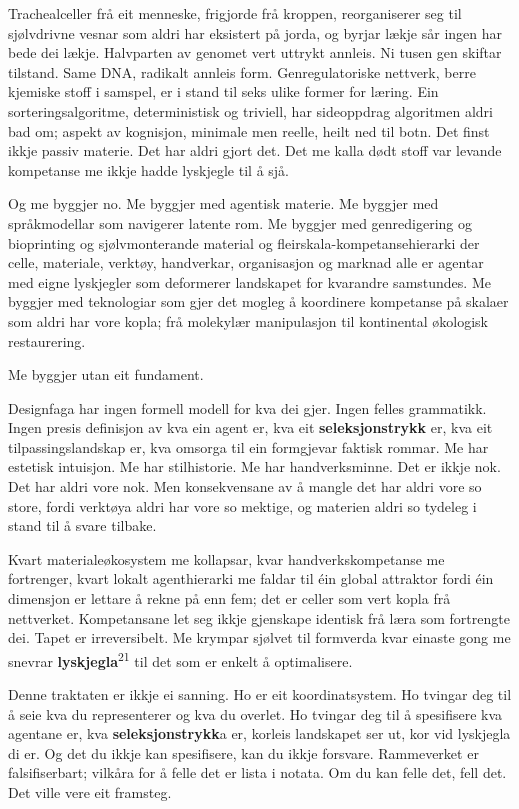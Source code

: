 \begin{widebody}
{Trachealceller frå eit menneske, frigjorde frå kroppen, reorganiserer seg til sjølvdrivne vesnar som aldri har eksistert på jorda, og byrjar lækje sår ingen har bede dei lækje. Halvparten av genomet vert uttrykt annleis. Ni tusen gen skiftar tilstand. Same DNA, radikalt annleis form. Genregulatoriske nettverk, berre kjemiske stoff i samspel, er i stand til seks ulike former for læring. Ein sorteringsalgoritme, deterministisk og triviell, har sideoppdrag algoritmen aldri bad om; aspekt av kognisjon, minimale men reelle, heilt ned til botn. Det finst ikkje passiv materie. Det har aldri gjort det. Det me kalla dødt stoff var levande kompetanse me ikkje hadde lyskjegle til å sjå.

Og me byggjer no. Me byggjer med agentisk materie. Me byggjer med språkmodellar som navigerer latente rom. Me byggjer med genredigering og bioprinting og sjølvmonterande material og fleirskala-kompetansehierarki der celle, materiale, verktøy, handverkar, organisasjon og marknad alle er agentar med eigne lyskjegler som deformerer landskapet for kvarandre samstundes. Me byggjer med teknologiar som gjer det mogleg å koordinere kompetanse på skalaer som aldri har vore kopla; frå molekylær manipulasjon til kontinental økologisk restaurering.

Me byggjer utan eit fundament.

Designfaga har ingen formell modell for kva dei gjer. Ingen felles grammatikk. Ingen presis definisjon av kva ein agent er, kva eit \textbf{seleksjonstrykk} er, kva eit tilpassingslandskap er, kva omsorga til ein formgjevar faktisk rommar. Me har estetisk intuisjon. Me har stilhistorie. Me har handverksminne. Det er ikkje nok. Det har aldri vore nok. Men konsekvensane av å mangle det har aldri vore so store, fordi verktøya aldri har vore so mektige, og materien aldri so tydeleg i stand til å svare tilbake.

Kvart materialeøkosystem me kollapsar, kvar handverkskompetanse me fortrenger, kvart lokalt agenthierarki me faldar til éin global attraktor fordi éin dimensjon er lettare å rekne på enn fem; det er celler som vert kopla frå nettverket. Kompetansane let seg ikkje gjenskape identisk frå læra som fortrengte dei. Tapet er irreversibelt. Me krympar sjølvet til formverda kvar einaste gong me snevrar \textbf{lyskjegla}\textsuperscript{21} til det som er enkelt å optimalisere.

Denne traktaten er ikkje ei sanning. Ho er eit koordinatsystem. Ho tvingar deg til å seie kva du representerer og kva du overlet. Ho tvingar deg til å spesifisere kva agentane er, kva \textbf{seleksjonstrykk}a er, korleis landskapet ser ut, kor vid lyskjegla di er. Og det du ikkje kan spesifisere, kan du ikkje forsvare. Rammeverket er falsifiserbart; vilkåra for å felle det er lista i notata. Om du kan felle det, fell det. Det ville vere eit framsteg.

}
\end{widebody}
